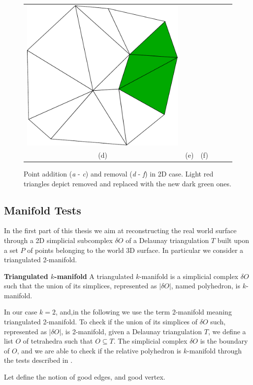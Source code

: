 \begin{figure}[t]
\begin{tabular}{cccccc}
\includegraphics[width=0.25\columnwidth]{./img//delaunayExampleMoving03}\\
(d)&(e)&(f)
\end{tabular}
\caption{Point addition (\emph{a} - \emph{c}) and removal (\emph{d} - \emph{f}) in 2D case. Light red triangles depict removed and replaced with the new dark green ones.}
\label{fig:moving}
\end{figure}



\subsection{Manifold Tests}
In the first part of this thesis we aim at reconstructing the real world surface through a 2D simplicial subcomplex $\delta O$ of a Delaunay triangulation $T$ built upon a set $\mathit{P}$ of points belonging to the world 3D surface.
In particular we consider a triangulated 2-manifold.

\begin{mydef}
\textbf{Triangulated $k$-manifold}
A triangulated $k$-manifold is a simplicial complex $\delta O$ such that the union of its simplices, represented as $|\delta O|$, named polyhedron, is $k$-manifold.
\end{mydef}

In our case $k=2$, and,in the following we use the term 2-manifold meaning triangulated 2-manifold.
To check if  the union of its simplices of $\delta O$ such, represented as $|\delta O|$, is 2-manifold, given a Delaunay triangulation $T$, we define a list $O$ of tetrahedra such that $O \subseteq T$. 
The simplicial complex $\delta O$ is the boundary of $O$, and we are able to check if the relative polyhedron is $k$-manifold through the tests described in \cite{lhuillier20152}.

Let define the notion of good edges, and good vertex.


